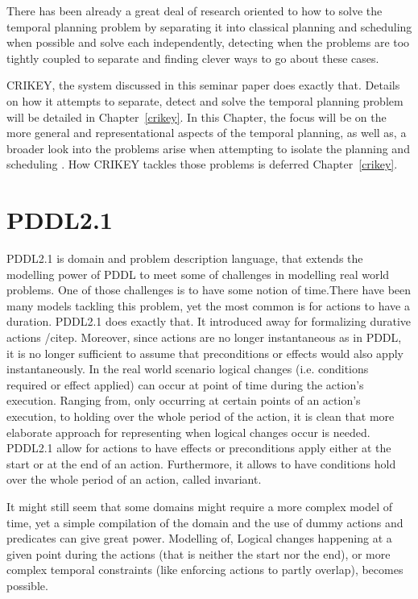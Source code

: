 \documentclass
[a4paper
,english
,parskip=half
,bibliography=totoc
]{scrreprt}
\begin{document}
    There has been already a great deal of research oriented to how to solve the temporal planning problem by separating it into classical planning and scheduling when possible and solve each independently, detecting when the problems are too tightly coupled to separate and finding clever ways to go about these cases.

    CRIKEY, the system discussed in this seminar paper does exactly that. Details on how it attempts to separate, detect and solve the temporal planning problem will be detailed in Chapter~\ref{crikey}. In this Chapter, the focus will be on the more general and representational aspects of the temporal planning, as well as, a broader look into the problems arise when attempting to isolate the planning and scheduling . How CRIKEY tackles those problems is deferred Chapter~\ref{crikey}.  

    
    \section{PDDL2.1} 
    PDDL2.1 is domain and problem description language, that extends the modelling power of PDDL \citep{} to meet some of challenges in modelling real world problems. One of those challenges is to have some notion of time.There have been many models tackling this problem, yet the most common is for actions to have a duration. PDDL2.1 does exactly that. It introduced away for formalizing durative actions /citep{}.
    Moreover, since actions are no longer instantaneous as in PDDL, it is no longer sufficient to assume that preconditions or effects would also apply instantaneously. In the real world scenario logical changes (i.e. conditions required or effect applied) can occur at point of time during the action's execution. Ranging from, only occurring at certain points of an action's execution, to holding over the whole period of the action, it is clean that more elaborate approach for representing when logical changes occur is needed. 
    PDDL2.1 allow for actions to have effects or preconditions apply either at the start or at the end of an action. Furthermore, it allows to have conditions hold over the whole period of an action, called invariant.

    It might still seem that some domains might require a more complex model of time, yet a simple compilation of the domain and the use of dummy actions and predicates can give great power. Modelling of, Logical changes happening at a given point during the actions (that is neither the start nor the end), or more complex temporal constraints (like enforcing actions to partly overlap), becomes possible.
\end{document}
